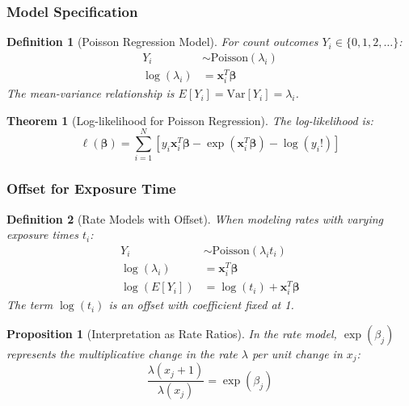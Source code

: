 \documentclass{article}
\newtheorem{definition}{Definition}
\newtheorem{theorem}{Theorem}
\newtheorem{proposition}{Proposition}
\begin{document}
\subsubsection{Model Specification}

\begin{definition}[Poisson Regression Model]
For count outcomes $Y_i \in \{0, 1, 2, \ldots\}$:
\begin{align}
Y_i &\sim \text{Poisson}(\lambda_i) \\
\log(\lambda_i) &= \mathbf{x}_i^T\boldsymbol{\beta}
\end{align}
The mean-variance relationship is $E[Y_i] = \text{Var}[Y_i] = \lambda_i$.
\end{definition}

\begin{theorem}[Log-likelihood for Poisson Regression]
The log-likelihood is:
\begin{equation}
\ell(\boldsymbol{\beta}) = \sum_{i=1}^N \left[y_i\mathbf{x}_i^T\boldsymbol{\beta} - \exp(\mathbf{x}_i^T\boldsymbol{\beta}) - \log(y_i!)\right]
\end{equation}
\end{theorem}

\subsubsection{Offset for Exposure Time}

\begin{definition}[Rate Models with Offset]
When modeling rates with varying exposure times $t_i$:
\begin{align}
Y_i &\sim \text{Poisson}(\lambda_i t_i) \\
\log(\lambda_i) &= \mathbf{x}_i^T\boldsymbol{\beta} \\
\log(E[Y_i]) &= \log(t_i) + \mathbf{x}_i^T\boldsymbol{\beta}
\end{align}
The term $\log(t_i)$ is an offset with coefficient fixed at 1.
\end{definition}

\begin{proposition}[Interpretation as Rate Ratios]
In the rate model, $\exp(\beta_j)$ represents the multiplicative change in the rate $\lambda$ per unit change in $x_j$:
\begin{equation}
\frac{\lambda(x_j + 1)}{\lambda(x_j)} = \exp(\beta_j)
\end{equation}
\end{proposition}
\end{document}

